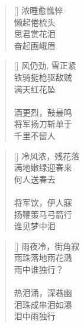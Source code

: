 \renewcommand{\poemtoc}{section}
\settowidth{\versewidth}{浓睡愈憔悴}
\begin{verse}[\versewidth]
浓睡愈憔悴\\
懒起倦梳头\\
思君赏花泪\\
奋起画峨眉
\end{verse}

\renewcommand{\poemtoc}{section}
\settowidth{\versewidth}{风仍劲, 雪正紧}
\begin{verse}[\versewidth]
风仍劲, 雪正紧\\
铁骑挺枪驱敌贼\\
满天红花坠\\
~\\
酒更烈，鼓最鸣\\
将军扬刀斩单于\\
千里不留人
\end{verse}

\renewcommand{\poemtoc}{section}
\settowidth{\versewidth}{风仍劲, 雪正紧}
\begin{verse}[\versewidth]
冷风浓，残花落\\
满地嫩绿迎春来\\
何人送春去\\
~\\
将军饮，伊人寐\\
扬鞭策马弓箭行\\
谁见梦中泪
\end{verse}

\renewcommand{\poemtoc}{section}
\settowidth{\versewidth}{风仍劲, 雪正紧}
\begin{verse}[\versewidth]
雨夜冷，街角寂\\
雨珠落地雨花溅\\
雨中谁独行？\\
~\\
热泪涌，深巷幽\\
泪珠成串泪如瀑\\
泪中雨独行
\end{verse}
